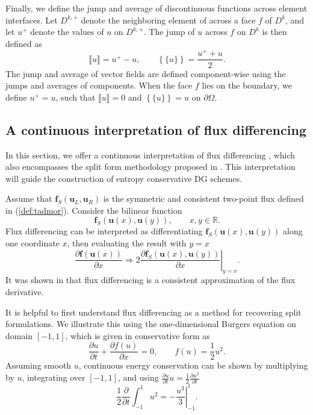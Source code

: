 \documentclass[preprint,10pt]{article}
\theoremstyle{definition}
\theoremstyle{lemma}
\theoremstyle{theorem}
\theoremstyle{assumption}
\newcommand{\pd}[2]{\frac{\partial#1}{\partial#2}}
\newcommand{\LRp}[1]{\left( #1 \right)}
\newcommand{\LRc}[1]{\left\{ #1 \right\}}
\newcommand{\jump}[1] {\ensuremath{\llbracket#1\rrbracket}}
\newcommand{\avg}[1] {\ensuremath{\LRc{\!\{#1\}\!}}}
\begin{document}
Finally, we define the jump and average of discontinuous functions across element interfaces.  Let $D^{k,+}$ denote the neighboring element of across a face $f$ of $D^k$, and let $u^+$ denote the values of $u$ on $D^{k,+}$.  The jump of $u$ across $f$ on $D^k$ is then defined as
\[
\jump{u} = u^+ - u, \qquad \avg{u} = \frac{u^+ + u}{2}.
\]
The jump and average of vector fields are defined component-wise using the jumps and averages of components.  When the face $f$ lies on the boundary, we define $u^+ = u$, such that $\jump{u} = 0$ and $\avg{u} = u$ on $\partial \Omega$.


\subsection{A continuous interpretation of flux differencing}

In this section, we offer a continuous interpretation of flux differencing \cite{fisher2013high,gassner2017br1,chen2017entropy}, which also encompasses the split form methodology proposed in \cite{gassner2016split}.  This interpretation will guide the construction of entropy conservative DG schemes.  

Assume that $\bm{f}_S(\bm{u}_L,\bm{u}_R)$ is the symmetric and consistent two-point flux defined in (\ref{def:tadmor}).  Consider the bilinear function
\[
\bm{f}_S\LRp{\bm{u}(x),\bm{u}(y)}, \qquad x, y \in \mathbb{R}.  
\]
Flux differencing can be interpreted as differentiating $\bm{f}_S\LRp{\bm{u}(x),\bm{u}(y)}$ along one coordinate $x$, then evaluating the result with $y=x$
\begin{equation}
\pd{\bm{f}(\bm{u}(x))}{x} \Longrightarrow 2\left.\pd{\bm{f}_S\LRp{\bm{u}(x),\bm{u}(y)}}{x}\right|_{y=x}.
\label{eq:fluxdiff}
\end{equation}
It was shown in \cite{chen2017entropy} that flux differencing is a consistent approximation of the flux derivative.  


It is helpful to first understand flux differencing as a method for recovering split formulations.  We illustrate this using the one-dimensional Burgers equation on domain $ [-1,1]$, which is given in conservative form as 
\[
\pd{u}{t} + \pd{f(u)}{x} = 0, \qquad f(u) = \frac{1}{2}u^2.
\]
Assuming smooth $u$, continuous energy conservation can be shown by multiplying by $u$, integrating over $[-1,1]$, and using $\pd{u}{t}u = \frac{1}{2}\pd{u^2}{t}$
\begin{equation}
\frac{1}{2}\pd{}{t}\int_{-1}^1{u}^2 = -\left.\frac{u^3}{3}\right|_{-1}^1.
\label{eq:burgersconservation}
\end{equation}
\end{document}
